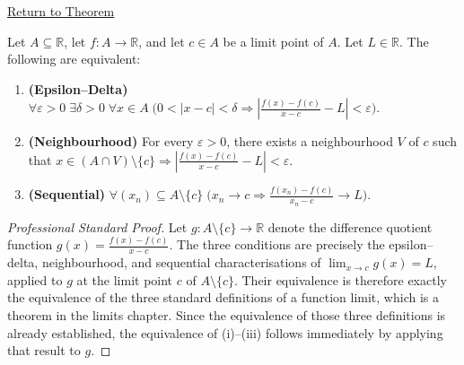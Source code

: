 \newpage
{}
\label{prf:derivative-equivalence}

\begin{remark*}[Return]
\hyperref[thm:derivative-equivalence]{Return to Theorem}
\end{remark*}

\begin{theorem*}
Let $A \subseteq \mathbb{R}$, let $f : A \to \mathbb{R}$, and let $c \in A$ be a limit point of $A$. Let $L \in \mathbb{R}$. The following are equivalent:
\begin{enumerate}[label=(\roman*)]
\item \textbf{(Epsilon--Delta)} $\forall \varepsilon > 0\;\exists \delta > 0\;\forall x \in A\;\bigl(0 < |x-c| < \delta \Rightarrow \left|\tfrac{f(x)-f(c)}{x-c} - L\right| < \varepsilon\bigr)$.
\item \textbf{(Neighbourhood)} For every $\varepsilon > 0$, there exists a neighbourhood $V$ of $c$ such that $x \in (A \cap V) \setminus \{c\} \Rightarrow \left|\tfrac{f(x)-f(c)}{x-c} - L\right| < \varepsilon$.
\item \textbf{(Sequential)} $\forall (x_n) \subseteq A \setminus \{c\}\;\bigl(x_n \to c \Rightarrow \tfrac{f(x_n)-f(c)}{x_n-c} \to L\bigr)$.
\end{enumerate}
\end{theorem*}

\begin{proof}[Professional Standard Proof]
\LRAProofBodyStart
Let $g : A \setminus \{c\} \to \mathbb{R}$ denote the difference quotient function $g(x) = \tfrac{f(x)-f(c)}{x-c}$. The three conditions are precisely the epsilon--delta, neighbourhood, and sequential characterisations of $\lim_{x \to c} g(x) = L$, applied to $g$ at the limit point $c$ of $A \setminus \{c\}$. Their equivalence is therefore exactly the equivalence of the three standard definitions of a function limit, which is a theorem in the limits chapter. Since the equivalence of those three definitions is already established, the equivalence of (i)--(iii) follows immediately by applying that result to $g$.
\end{proof}

